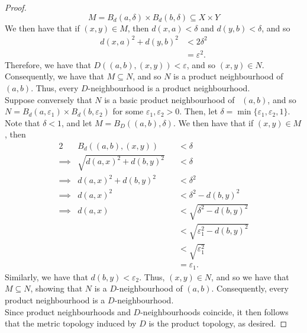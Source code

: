 \documentclass[12pt]{article}
\begin{document}
\begin{proof}
  \begin{equation*}
    M=B_d(a,\delta)\times B_d(b,\delta)\subseteq X\times Y
  \end{equation*}
  \indent We then have that if $(x,y)\in M$, then $d(x,a)<\delta$
  and $d(y,b)<\delta$, and so
  \begin{align*}
    d(x,a)^2 + d(y,b)^2 &< 2\delta^2 \\
    &= \varepsilon^2.
  \end{align*}
  Therefore, we have that $D\left( (a,b),(x,y) \right)<\varepsilon$,
  and so $(x,y)\in N$.
  Consequently, we have that $M\subseteq N$, and so $N$ is a product
  neighbourhood of $(a,b)$.
  Thus, every $D$-neighbourhood is a product neighbourhood.\\
  \indent Suppose conversely that $N$ is a basic product neighbourhood of \
  $(a,b)$, and so \\$N=B_d(a,\varepsilon_1)\times B_d(b,\varepsilon_2)$
  for some $\varepsilon_1,\varepsilon_2 > 0$.
  Then, let $\delta=\min\{\varepsilon_1,\varepsilon_2,1\}$.
  Note that $\delta<1$, and let $M=B_D\left( (a,b),\delta \right).$
  We then have that if $(x,y)\in M$, then
  \begin{alignat*}{2}
    & B_d\left( (a,b),(x,y) \right) &&< \delta \\
    \implies & \sqrt{d(a,x)^2+d(b,y)^2} &&< \delta \\
    \implies & d(a,x)^2 + d(b,y)^2 &&< \delta^2 \\
    \implies & d(a,x)^2 &&< \delta^2 - d(b,y)^2 \\
    \implies & d(a,x) &&< \sqrt{\delta^2-d(b,y)^2} \\
    &&&< \sqrt{\varepsilon_1^2-d(b,y)^2}\\
    &&&< \sqrt{\varepsilon_1^2}\\
    &&&= \varepsilon_1.
  \end{alignat*}
  Similarly, we have that $d(b,y)<\varepsilon_2$.
  Thus, $(x,y)\in N$, and so we have that $M\subseteq N$, showing that
  $N$ is a $D$-neighbourhood of $(a,b)$.
  Consequently, every product neighbourhood is a $D$-neighbourhood.\\ 
  \indent Since product neighbourhoods and $D$-neighbourhoods coincide,
  it then follows that the metric topology induced by $D$ is the
  product topology, as desired.
\end{proof}
\end{document}
